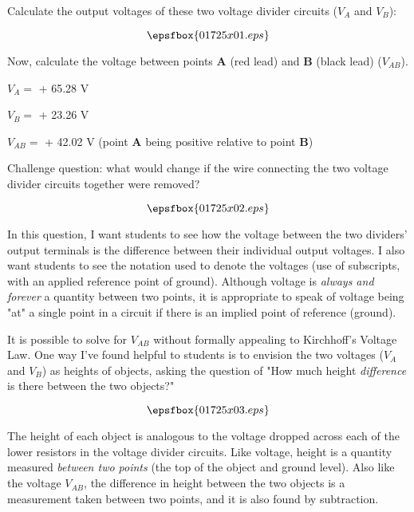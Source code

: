 

Calculate the output voltages of these two voltage divider circuits ($V_A$ and $V_B$):

$$\epsfbox{01725x01.eps}$$

Now, calculate the voltage between points {\bf A} (red lead) and {\bf B} (black lead) ($V_{AB}$).







$V_A =$ + 65.28 V

$V_B =$ + 23.26 V

$V_{AB} =$ + 42.02 V (point {\bf A} being positive relative to point {\bf B})

\vskip 10pt

Challenge question: what would change if the wire connecting the two voltage divider circuits together were removed?

$$\epsfbox{01725x02.eps}$$







In this question, I want students to see how the voltage between the two dividers' output terminals is the difference between their individual output voltages.  I also want students to see the notation used to denote the voltages (use of subscripts, with an applied reference point of ground).  Although voltage is {\it always and forever} a quantity between two points, it is appropriate to speak of voltage being "at" a single point in a circuit if there is an implied point of reference (ground).

It is possible to solve for $V_{AB}$ without formally appealing to Kirchhoff's Voltage Law.  One way I've found helpful to students is to envision the two voltages ($V_A$ and $V_B$) as heights of objects, asking the question of "How much height {\it difference} is there between the two objects?"

$$\epsfbox{01725x03.eps}$$

The height of each object is analogous to the voltage dropped across each of the lower resistors in the voltage divider circuits.  Like voltage, height is a quantity measured {\it between two points} (the top of the object and ground level).  Also like the voltage $V_{AB}$, the difference in height between the two objects is a measurement taken between two points, and it is also found by subtraction.




